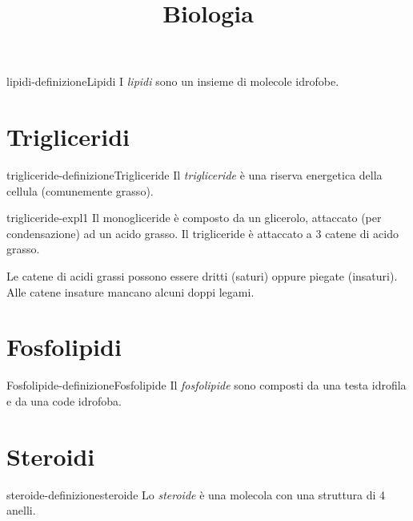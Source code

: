\documentclass[preview]{standalone}
\begin{document}
\title{Biologia}
\genpage

\begin{snippetdefinition}{lipidi-definizione}{Lipidi}
    I \textit{lipidi} sono un insieme di molecole idrofobe.
\end{snippetdefinition}



\section{Trigliceridi}

\begin{snippetdefinition}{trigliceride-definizione}{Trigliceride}
    Il \textit{trigliceride} è una riserva energetica della cellula (comunemente grasso).
\end{snippetdefinition}

\begin{snippet}{trigliceride-expl1}
    Il monogliceride è composto da un glicerolo, attaccato (per condensazione) ad un acido grasso.
    Il trigliceride è attaccato a 3 catene di acido grasso.

    Le catene di acidi grassi possono essere dritti (saturi) oppure piegate (insaturi).
    Alle catene insature mancano alcuni doppi legami.
\end{snippet}

\section{Fosfolipidi}

\begin{snippetdefinition}{Fosfolipide-definizione}{Fosfolipide}
    Il \textit{fosfolipide} sono composti da una testa idrofila e da una code idrofoba.
\end{snippetdefinition}


\section{Steroidi}

\begin{snippetdefinition}{steroide-definizione}{steroide}
    Lo \textit{steroide} è una molecola con una struttura di 4 anelli.
\end{snippetdefinition}

\end{document}
